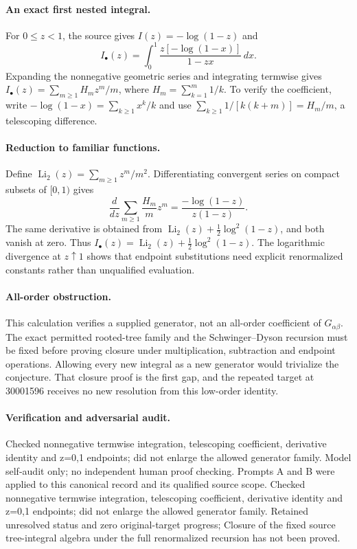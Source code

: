 \documentclass[11pt]{article}
\begin{document}
\paragraph{An exact first nested integral.} For $0\leq z<1$, the source gives $I(z)=-\log(1-z)$ and
\[
 I_\bullet(z)=\int_0^1\frac{z[-\log(1-x)]}{1-zx}\,dx.
\]
Expanding the nonnegative geometric series and integrating termwise gives $I_\bullet(z)=\sum_{m\geq1}H_mz^m/m$, where $H_m=\sum_{k=1}^m1/k$. To verify the coefficient, write $-\log(1-x)=\sum_{k\geq1}x^k/k$ and use $\sum_{k\geq1}1/[k(k+m)]=H_m/m$, a telescoping difference.

\paragraph{Reduction to familiar functions.} Define $\operatorname{Li}_2(z)=\sum_{m\geq1}z^m/m^2$. Differentiating convergent series on compact subsets of $[0,1)$ gives
\[
 \frac d{dz}\sum_{m\geq1}\frac{H_m}{m}z^m
 =\frac{-\log(1-z)}{z(1-z)}.
\]
The same derivative is obtained from $\operatorname{Li}_2(z)+\tfrac12\log^2(1-z)$, and both vanish at zero. Thus $I_\bullet(z)=\operatorname{Li}_2(z)+\tfrac12\log^2(1-z)$. The logarithmic divergence at $z\uparrow1$ shows that endpoint substitutions need explicit renormalized constants rather than unqualified evaluation.

\paragraph{All-order obstruction.} This calculation verifies a supplied generator, not an all-order coefficient of $G_{\alpha\beta}$. The exact permitted rooted-tree family and the Schwinger--Dyson recursion must be fixed before proving closure under multiplication, subtraction and endpoint operations. Allowing every new integral as a new generator would trivialize the conjecture. That closure proof is the first gap, and the repeated target at 30001596 receives no new resolution from this low-order identity.

\paragraph{Verification and adversarial audit.}
Checked nonnegative termwise integration, telescoping coefficient, derivative identity and z=0,1 endpoints; did not enlarge the allowed generator family. Model self-audit only; no independent human proof checking. Prompts A and B were applied to this canonical record and its qualified source scope. Checked nonnegative termwise integration, telescoping coefficient, derivative identity and z=0,1 endpoints; did not enlarge the allowed generator family. Retained unresolved status and zero original-target progress; Closure of the fixed source tree-integral algebra under the full renormalized recursion has not been proved.
\end{document}
